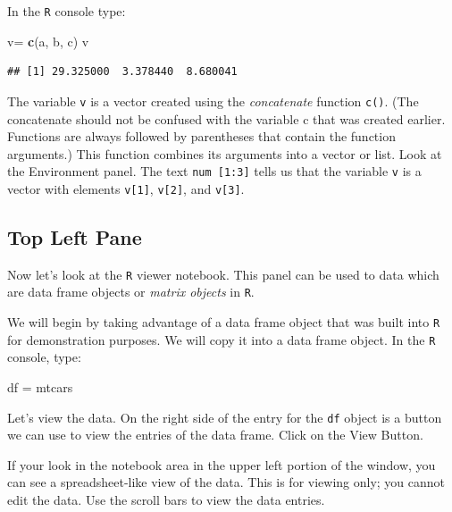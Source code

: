 \documentclass[
]{book}
\newenvironment{Shaded}{\begin{snugshade}}{\end{snugshade}}
\newcommand{\KeywordTok}[1]{\textcolor[rgb]{0.13,0.29,0.53}{\textbf{#1}}}
\newcommand{\NormalTok}[1]{#1}
\newcommand{\StringTok}[1]{\textcolor[rgb]{0.31,0.60,0.02}{#1}}
\begin{document}
In the \texttt{R} console type:

\begin{Shaded}
\begin{Highlighting}[]
\NormalTok{v=}\StringTok{ }\KeywordTok{c}\NormalTok{(a, b, c)}
\NormalTok{v}
\end{Highlighting}
\end{Shaded}

\begin{verbatim}
## [1] 29.325000  3.378440  8.680041
\end{verbatim}

The variable \texttt{v} is a vector created using the \emph{concatenate} function \texttt{c()}. (The concatenate should not be confused with the variable c that was created earlier. Functions are always followed by parentheses that contain the function arguments.) This function combines its arguments into a vector or list. Look at the Environment panel. The text \texttt{num\ {[}1:3{]}} tells us that the variable \texttt{v} is a vector with elements \texttt{v{[}1{]}}, \texttt{v{[}2{]}}, and \texttt{v{[}3{]}}.

\hypertarget{top-left-pane}{%
\subsection*{Top Left Pane}\label{top-left-pane}}

Now let's look at the \texttt{R} viewer notebook. This panel can be used to data which are data frame objects or \emph{matrix objects} in \texttt{R}.

We will begin by taking advantage of a data frame object that was built into \texttt{R} for demonstration purposes. We will copy it into a data frame object. In the \texttt{R} console, type:

\begin{Shaded}
\begin{Highlighting}[]
\NormalTok{df =}\StringTok{ }\NormalTok{mtcars}
\end{Highlighting}
\end{Shaded}

Let's view the data. On the right side of the entry for the \texttt{df} object is a button we can use to view the entries of the data frame. Click on the View Button.

If your look in the notebook area in the upper left portion of the window, you can see a spreadsheet-like view of the data. This is for viewing only; you cannot edit the data. Use the scroll bars to view the data entries.
\end{document}
